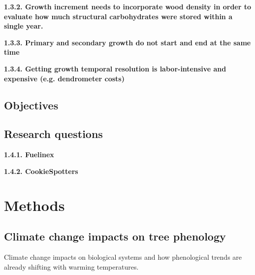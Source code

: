 \documentclass{article}
\begin{document}
\textbf{1.3.2. Growth increment needs to incorporate wood density in order to evaluate how much structural carbohydrates were stored within a single year.}

\textbf{1.3.3. Primary and secondary growth do not start and end at the same time}

\textbf{1.3.4. Getting growth temporal resolution is labor-intensive and expensive (e.g. dendrometer costs)}




\subsection{Objectives} 

\subsection {Research questions} 

\textbf{1.4.1. Fuelinex}

\textbf{1.4.2. CookieSpotters}


\section{Methods}

\subsection{Climate change impacts on tree phenology} 
Climate change impacts on biological systems and how phenological trends are already shifting with warming temperatures. 
\end{document}
